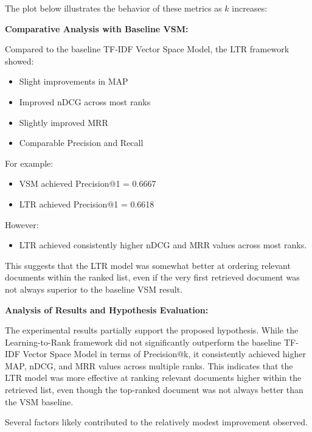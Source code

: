 \documentclass{article}
\begin{document}
The plot below illustrates the behavior of these metrics as $k$ increases:


\textbf{Comparative Analysis with Baseline VSM:}

Compared to the baseline TF-IDF Vector Space Model, the LTR framework showed:
\begin{itemize}
    \item Slight improvements in MAP
    \item Improved nDCG across most ranks
    \item Slightly improved MRR
    \item Comparable Precision and Recall
\end{itemize}

For example:
\begin{itemize}
    \item VSM achieved Precision@1 = 0.6667
    \item LTR achieved Precision@1 = 0.6618
\end{itemize}

However:
\begin{itemize}
    \item LTR achieved consistently higher nDCG and MRR values across most ranks.
\end{itemize}

This suggests that the LTR model was somewhat better at ordering relevant documents within the ranked list, even if the very first retrieved document was not always superior to the baseline VSM result.

\textbf{Analysis of Results and Hypothesis Evaluation:}

The experimental results partially support the proposed hypothesis. While the Learning-to-Rank framework did not significantly outperform the baseline TF-IDF Vector Space Model in terms of Precision@k, it consistently achieved higher MAP, nDCG, and MRR values across multiple ranks. This indicates that the LTR model was more effective at ranking relevant documents higher within the retrieved list, even though the top-ranked document was not always better than the VSM baseline.

Several factors likely contributed to the relatively modest improvement observed.
\end{document}
